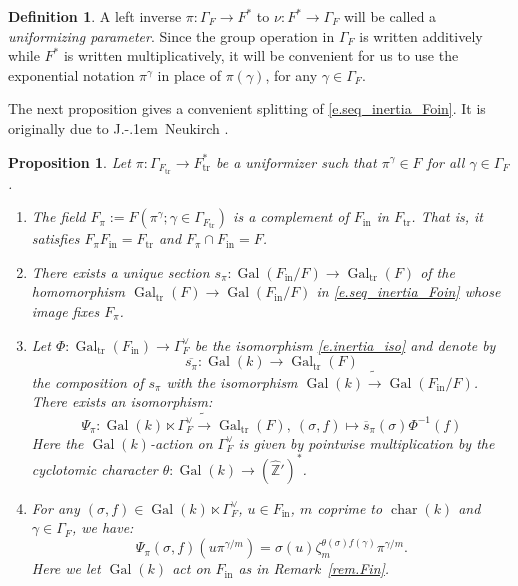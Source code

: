 \documentclass[12pt]{amsart}
\numberwithin{equation}{section}
\newtheorem{proposition}[theorem]{Proposition}
\theoremstyle{definition}
\newtheorem{definition}[theorem]{Definition}
\newcommand{\bZ}{\mathbb{Z}}
\newcommand{\Gal}{\operatorname{Gal}}
\newcommand{\Char}{\operatorname{char}}
\newcommand{\tr}{\operatorname{tr}}
\newcommand{\Ftr}{F_{\tr}}
\newcommand{\oin}{\operatorname{in}}
\newcommand{\Fin}{F_{\oin}}
\newcommand{\Galtr}{\Gal_{\tr}}
\newcommand{\I}[1]{\Gamma_{#1}^{\vee}}
\begin{document}
\begin{definition}
    A left inverse $\pi : \Gamma_F \to F^*$ to $\nu: F^* \to %
    \Gamma_F$ will be called a \emph{uniformizing parameter}.
    Since the group operation in $\Gamma_F$ is written additively while $F^*$ is written multiplicatively, it will be convenient for us to use the exponential notation $\pi^{\gamma}$ in place of $\pi(\gamma)$, for any
    $\gamma\in  \Gamma_F$.
\end{definition}

The next proposition gives a convenient splitting of \eqref{e.seq_inertia_Foin}. It is originally due to J.\kern-.1em\ Neukirch \cite[Satz 2]{neukirch1968verzweigungstheorie}.

\begin{proposition}\label{prop.decomp_of_Gal}
    Let $\pi: \Gamma_{\Ftr} \to \Ftr^*$  be a uniformizer such that $\pi^{\gamma} \in F$ for all $\gamma\in \Gamma_{F}$. 
    \begin{enumerate}
        \item The field $F_{\pi} := F(\pi^{\gamma}; \gamma\in \Gamma_{\Ftr})$ is a complement of $\Fin$ in $\Ftr$. That is, it satisfies $F_{\pi} F_{\oin} = \Ftr$ and $F_{\pi}\cap \Fin = F$.
        \item There exists a unique section $s_{\pi} : \Gal(\Fin/F)\to \Gal_{\tr}(F)$ of the homomorphism $\Galtr(F)\to \Gal(\Fin/F)$ in \eqref{e.seq_inertia_Foin} whose image fixes $F_{\pi}$.
        \item Let $\Phi: \Galtr(\Fin) \to \I{F}$ be the isomorphism  \eqref{e.inertia_iso} and denote by $$\overline{s_\pi}: \Gal(k) \to \Galtr(F)$$ the composition of $s_\pi$ with the isomorphism $\Gal(k)\tilde{\to} \Gal(\Fin/F)$. There exists an isomorphism: $$\Psi_{\pi} : \Gal(k)\ltimes \I{F} \tilde{\to} \Galtr(F), \  (\sigma,f)\mapsto \overline{s}_\pi(\sigma) \Phi^{-1}(f)$$ Here the $\Gal(k)$-action on $\I{F}$ is given by pointwise multiplication by the cyclotomic character $\theta: \Gal(k) \to (\hat{\bZ}')^*$.
        \item For any $(\sigma,f)\in \Gal(k)\ltimes \I{F}$, $u\in \Fin$, $m$ coprime to $\Char(k)$ and $\gamma\in \Gamma_F$, we have:
        \begin{equation}\label{e.phi(1,1)}
        \Psi_\pi(\sigma,f)(u\pi^{\gamma/m}) = \sigma(u)\zeta_{m}^{\theta(\sigma) f(\gamma)} \pi^{\gamma/m}.
        \end{equation}
        Here we let $\Gal(k)$ act on $\Fin$ as in Remark~\ref{rem.Fin}.
        
    \end{enumerate}
\end{proposition}
\end{document}
